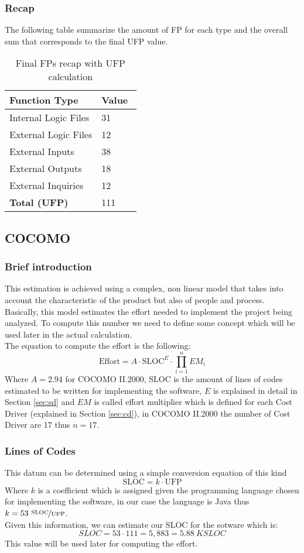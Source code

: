 \subsubsection{Recap}
The following table summarize the amount of FP for each type and the overall sum that corresponds to the final UFP value.
\begin{table}[H]
	\centering
	\begin{tabular}{p{0.7\linewidth}R{0.3\linewidth}}
		\hline
		\textbf{Function Type} & \textbf{Value} \\ \hline
		Internal Logic Files & 31 \\
		External Logic Files & 12 \\
		External Inputs & 38 \\
		External Outputs & 18 \\
		External Inquiries & 12 \\
		\textbf{Total (UFP)} & 111 \\
		\hline
	\end{tabular}
	\caption{Final FPs recap with UFP calculation}
\end{table}
\subsection{COCOMO}
\subsubsection{Brief introduction}
\label{sec:cocomo-int}
This estimation is achieved using a complex, non linear model that takes into account the characteristic of the product but also of people and process. \\
Basically, this model estimates the effort needed to implement the project being analyzed. To compute this number we need to define some concept which will be used later in the actual calculation. \\
The equation to compute the effort is the following:
$$\textrm{Effort} = A \cdot \textrm{SLOC}^E \cdot \prod_{i=1}^{n} EM_i$$
Where $A = 2.94$ for COCOMO II.2000, SLOC is the amount of lines of codes estimated to be written for implementing the software, $E$ is explained in detail in Section \ref{sec:sd} and $EM$ is called effort multiplier which is defined for each Cost Driver (explained in Section \ref{sec:cd}), in COCOMO II.2000 the number of Cost Driver are 17 thus $n = 17$.
\subsubsection{Lines of Codes}
This datum can be determined using a simple conversion equation of this kind
$$ \textrm{SLOC} = k \cdot \textrm{UFP} $$
Where $k$ is a coefficient which is assigned given the programming language chosen for implementing the software, in our case the language is Java thus $k = 53\ \nicefrac{\textrm{SLOC}}{\textrm{UFP}}$. \\
Given this information, we can estimate our SLOC for the sotware which is:
$$SLOC = 53 \cdot 111 = 5,883 = 5.88\ KSLOC$$
This value will be used later for computing the effort.
